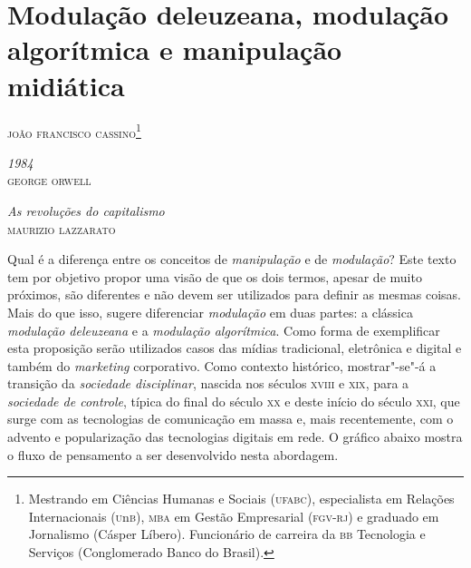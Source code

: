 \chapter{Modulação deleuzeana, modulação algorítmica e manipulação midiática}

\begin{flushright}
\textsc{joão francisco cassino\footnote{Mestrando em Ciências Humanas e Sociais (\textsc{ufabc}), especialista em Relações Internacionais (\textsc{u}n\textsc{b}), \textsc{mba} em Gestão Empresarial (\textsc{fgv-rj}) e graduado em Jornalismo (Cásper Líbero). Funcionário de carreira da \textsc{bb} Tecnologia e Serviços (Conglomerado Banco do Brasil).}}
\end{flushright}

\setlength{\epigraphwidth}{.60\textwidth}
\begin{epigraphs} 
{\textit{1984}\\\textsc{george orwell}}

\medskip

{\textit{As revoluções do capitalismo}\\\textsc{maurizio lazzarato}}
\end{epigraphs} 

\noindent{}Qual é a diferença entre os conceitos de \textit{manipulação} e de
\textit{modulação}? Este texto tem por objetivo propor uma visão de que os
dois termos, apesar de muito próximos, são diferentes e não devem ser
utilizados para definir as mesmas coisas. Mais do que isso, sugere
diferenciar \textit{modulação} em duas partes: a clássica \textit{modulação
deleuzeana} e a \textit{modulação algorítmica}. Como forma de exemplificar
esta proposição serão utilizados casos das mídias tradicional,
eletrônica e digital e também do \textit{marketing} corporativo. Como
contexto histórico, mostrar"-se"-á a transição da \textit{sociedade
disciplinar}, nascida nos séculos \textsc{xviii} e \textsc{xix}, para a \textit{sociedade de
controle}, típica do final do século \textsc{xx} e deste início do século \textsc{xxi},
que surge com as tecnologias de comunicação em massa e, mais
recentemente, com o advento e popularização das tecnologias digitais em
rede. O gráfico abaixo mostra o fluxo de pensamento a ser desenvolvido nesta
abordagem.

